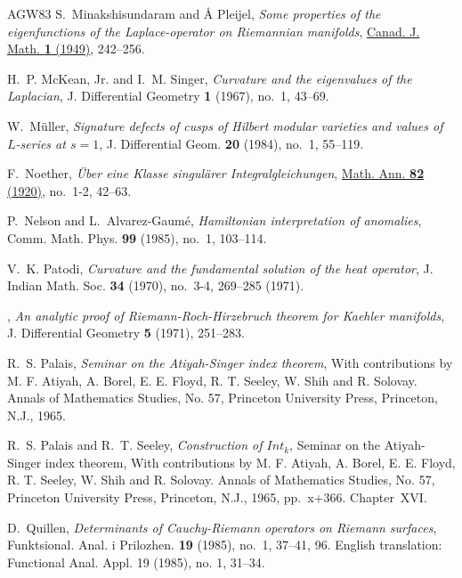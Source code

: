 \documentclass[11pt]{amsart}
\theoremstyle{definition}
\theoremstyle{remark}
\theoremstyle{plain}
\numberwithin{equation}{section}
\renewcommand{\:}{\colon}
\begin{document}
\begin{thebibliography}{AGW83}
S.~Minakshisundaram and \r{A} Pleijel, \emph{Some properties of the
  eigenfunctions of the {L}aplace-operator on {R}iemannian manifolds},
  \href{http://dx.doi.org/10.4153/cjm-1949-021-5}{Canad. J. Math. \textbf{1}
  (1949)}, 242--256.

H.~P. McKean, Jr. and I.~M. Singer, \emph{Curvature and the eigenvalues of the
  {L}aplacian}, J. Differential Geometry \textbf{1} (1967), no.~1, 43--69.

W.~M\"{u}ller, \emph{Signature defects of cusps of {H}ilbert modular varieties
  and values of {$L$}-series at {$s=1$}}, J. Differential Geom. \textbf{20}
  (1984), no.~1, 55--119.

F.~Noether, \emph{\"{U}ber eine {K}lasse singul\"{a}rer {I}ntegralgleichungen},
  \href{http://dx.doi.org/10.1007/BF01457974}{Math. Ann. \textbf{82} (1920)},
  no.~1-2, 42--63.

P.~Nelson and L.~Alvarez-Gaum{{\'e}}, \emph{Hamiltonian interpretation of
  anomalies}, Comm. Math. Phys. \textbf{99} (1985), no.~1, 103--114.

V.~K. Patodi, \emph{Curvature and the fundamental solution of the heat
  operator}, J. Indian Math. Soc. \textbf{34} (1970), no.~3-4, 269--285 (1971).

\bysame, \emph{An analytic proof of {R}iemann-{R}och-{H}irzebruch theorem for
  {K}aehler manifolds}, J. Differential Geometry \textbf{5} (1971), 251--283.

R.~S. Palais, \emph{Seminar on the {A}tiyah-{S}inger index theorem}, With
  contributions by M. F. Atiyah, A. Borel, E. E. Floyd, R. T. Seeley, W. Shih
  and R. Solovay. Annals of Mathematics Studies, No. 57, Princeton University
  Press, Princeton, N.J., 1965.

R.~S. Palais and R.~T. Seeley, \emph{Construction of $Int_k$}, Seminar on the
  {A}tiyah-{S}inger index theorem, With contributions by M. F. Atiyah, A.
  Borel, E. E. Floyd, R. T. Seeley, W. Shih and R. Solovay. Annals of
  Mathematics Studies, No. 57, Princeton University Press, Princeton, N.J.,
  1965, pp.~x+366. Chapter~XVI.

D.~Quillen, \emph{Determinants of {C}auchy-{R}iemann operators on {R}iemann
  surfaces}, Funktsional. Anal. i Prilozhen. \textbf{19} (1985), no.~1, 37--41,
  96. English translation: Functional Anal. Appl. 19 (1985), no. 1, 31--34.


\end{thebibliography}
\end{document}
